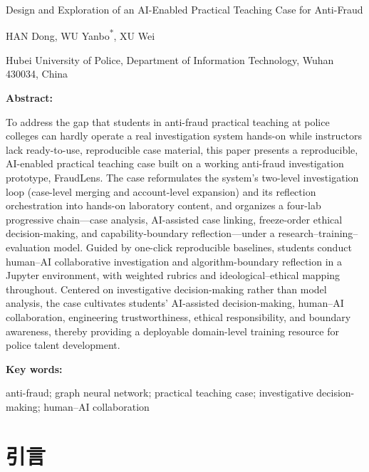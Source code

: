 \documentclass[12pt,a4paper]{ctexart}
\newif\ifanon
\begin{document}
\vspace{1em}
\begin{center}
  {\heiti\Large Design and Exploration of an AI-Enabled Practical Teaching Case for Anti-Fraud}
  \ifanon
  \else
  \vspace{0.5em}
  {\normalsize HAN Dong, WU Yanbo\textsuperscript{*}, XU Wei}

  {\small Hubei University of Police, Department of Information Technology, Wuhan 430034, China}
  \fi
\end{center}

\begin{center}\textbf{Abstract:}\end{center}
\noindent To address the gap that students in anti-fraud practical teaching at police colleges can hardly operate a real investigation system hands-on while instructors lack ready-to-use, reproducible case material, this paper presents a reproducible, AI-enabled practical teaching case built on a working anti-fraud investigation prototype, FraudLens. The case reformulates the system's two-level investigation loop (case-level merging and account-level expansion) and its reflection orchestration into hands-on laboratory content, and organizes a four-lab progressive chain—case analysis, AI-assisted case linking, freeze-order ethical decision-making, and capability-boundary reflection—under a research–training–evaluation model. Guided by one-click reproducible baselines, students conduct human–AI collaborative investigation and algorithm-boundary reflection in a Jupyter environment, with weighted rubrics and ideological–ethical mapping throughout. Centered on investigative decision-making rather than model analysis, the case cultivates students' AI-assisted decision-making, human–AI collaboration, engineering trustworthiness, ethical responsibility, and boundary awareness, thereby providing a deployable domain-level training resource for police talent development.

\begin{center}\textbf{Key words:}\end{center}
anti-fraud; graph neural network; practical teaching case; investigative decision-making; human–AI collaboration

\section{引言}
\end{document}
